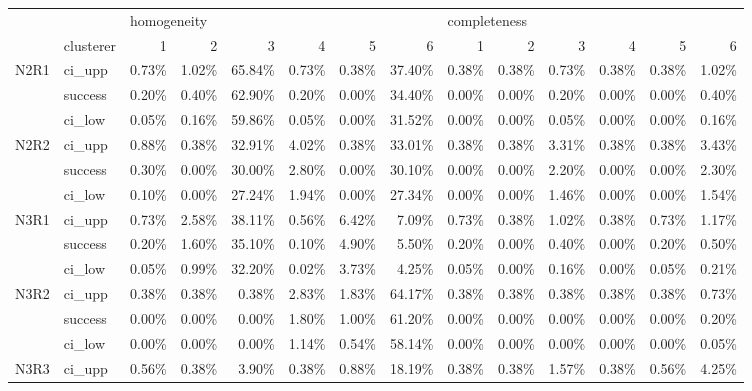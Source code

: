 \begin{tabular}{llrrrrrrrrrrrr}
\toprule
     & {} & \multicolumn{6}{l}{homogeneity} & \multicolumn{6}{l}{completeness} \\
     & clusterer &           1 &      2 &      3 &      4 &      5 &      6 &            1 &     2 &     3 &     4 &     5 &     6 \\
\midrule
N2R1 & ci\_upp &       0.73\% &  1.02\% & 65.84\% &  0.73\% &  0.38\% & 37.40\% &        0.38\% & 0.38\% & 0.73\% & 0.38\% & 0.38\% & 1.02\% \\
     & success &       0.20\% &  0.40\% & 62.90\% &  0.20\% &  0.00\% & 34.40\% &        0.00\% & 0.00\% & 0.20\% & 0.00\% & 0.00\% & 0.40\% \\
     & ci\_low &       0.05\% &  0.16\% & 59.86\% &  0.05\% &  0.00\% & 31.52\% &        0.00\% & 0.00\% & 0.05\% & 0.00\% & 0.00\% & 0.16\% \\
N2R2 & ci\_upp &       0.88\% &  0.38\% & 32.91\% &  4.02\% &  0.38\% & 33.01\% &        0.38\% & 0.38\% & 3.31\% & 0.38\% & 0.38\% & 3.43\% \\
     & success &       0.30\% &  0.00\% & 30.00\% &  2.80\% &  0.00\% & 30.10\% &        0.00\% & 0.00\% & 2.20\% & 0.00\% & 0.00\% & 2.30\% \\
     & ci\_low &       0.10\% &  0.00\% & 27.24\% &  1.94\% &  0.00\% & 27.34\% &        0.00\% & 0.00\% & 1.46\% & 0.00\% & 0.00\% & 1.54\% \\
N3R1 & ci\_upp &       0.73\% &  2.58\% & 38.11\% &  0.56\% &  6.42\% &  7.09\% &        0.73\% & 0.38\% & 1.02\% & 0.38\% & 0.73\% & 1.17\% \\
     & success &       0.20\% &  1.60\% & 35.10\% &  0.10\% &  4.90\% &  5.50\% &        0.20\% & 0.00\% & 0.40\% & 0.00\% & 0.20\% & 0.50\% \\
     & ci\_low &       0.05\% &  0.99\% & 32.20\% &  0.02\% &  3.73\% &  4.25\% &        0.05\% & 0.00\% & 0.16\% & 0.00\% & 0.05\% & 0.21\% \\
N3R2 & ci\_upp &       0.38\% &  0.38\% &  0.38\% &  2.83\% &  1.83\% & 64.17\% &        0.38\% & 0.38\% & 0.38\% & 0.38\% & 0.38\% & 0.73\% \\
     & success &       0.00\% &  0.00\% &  0.00\% &  1.80\% &  1.00\% & 61.20\% &        0.00\% & 0.00\% & 0.00\% & 0.00\% & 0.00\% & 0.20\% \\
     & ci\_low &       0.00\% &  0.00\% &  0.00\% &  1.14\% &  0.54\% & 58.14\% &        0.00\% & 0.00\% & 0.00\% & 0.00\% & 0.00\% & 0.05\% \\
N3R3 & ci\_upp &       0.56\% &  0.38\% &  3.90\% &  0.38\% &  0.88\% & 18.19\% &        0.38\% & 0.38\% & 1.57\% & 0.38\% & 0.56\% & 4.25\% \\

\end{tabular}

